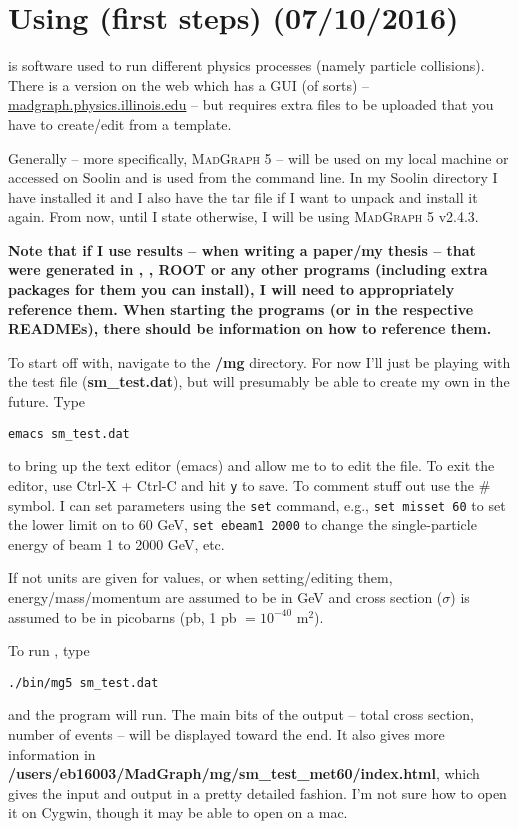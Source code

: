 \newpage
\chapter{Using \madgraph (first steps) (07/10/2016)}

\madgraph \cite{Alwall:2011madgraph} is software used to run different physics processes (namely particle collisions). There is a version on the web which has a GUI (of sorts) -- \url{madgraph.physics.illinois.edu} -- but requires extra files to be uploaded that you have to create/edit from a template.

Generally \madgraph -- more specifically, \textsc{MadGraph 5} -- will be used on my local machine or accessed on Soolin and is used from the command line. In my Soolin directory I have installed it and I also have the tar file if I want to unpack and install it again. From now, until I state otherwise, I will be using \textsc{MadGraph 5} v2.4.3.

\textbf{Note that if I use results -- when writing a paper/my thesis -- that were generated in \madgraph, \madanalysis, ROOT or any other programs (including extra packages for them you can install), I will need to appropriately reference them. When starting the programs (or in the respective READMEs), there should be information on how to reference them.}

To start off with, navigate to the \textbf{/mg} directory. For now I'll just be playing with the test file (\textbf{sm\_test.dat}), but will presumably be able to create my own in the future. Type

\texttt{emacs sm\_test.dat}

to bring up the text editor (emacs) and allow me to to edit the file. To exit the editor, use Ctrl-X + Ctrl-C and hit \texttt{y} to save. To comment stuff out use the \# symbol. I can set parameters using the \texttt{set} command, e.g., \texttt{set misset 60} to set the lower limit on \etmiss to 60 GeV, \texttt{set ebeam1 2000} to change the single-particle energy of beam 1 to 2000 GeV, etc.

If not units are given for values, or when setting/editing them, energy/mass/momentum are assumed to be in GeV and cross section ($\sigma$) is assumed to be in picobarns (pb, 1 pb $= 10^{-40}$ m$^2$).

To run \madgraph, type

\texttt{./bin/mg5 sm\_test.dat}

and the program will run. The main bits of the output -- total cross section, number of events -- will be displayed toward the end. It also gives more information in \textbf{/users/eb16003/MadGraph/mg/sm\_test\_met60/index.html}, which gives the input and output in a pretty detailed fashion. I'm not sure how to open it on Cygwin, though it may be able to open on a mac.

